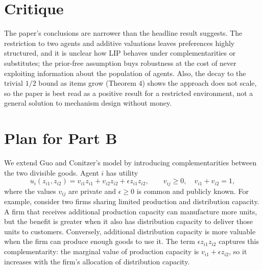\documentclass{article}
\begin{document}


\section{Critique}
The paper’s conclusions are narrower than the headline result suggests. The restriction to two agents and
additive valuations leaves preferences highly structured, and it is unclear how LIP behaves under complementarities or substitutes; the prior-free assumption buys robustness at the cost of never exploiting information
about the population of agents.
Also, the decay to the trivial $1/2$ bound as items grow (Theorem $4$) shows the approach does not scale, so
the paper is best read as a positive result for a restricted environment, not a general solution to mechanism
design without money.

\section{Plan for Part B}
We extend Guo and Conitzer's model by introducing complementarities between the two divisible goods. Agent $i$ has utility
\[
u_i(z_{i1},z_{i2})
=v_{i1}z_{i1}+v_{i2}z_{i2}+\epsilon z_{i1}z_{i2},
\qquad v_{ij}\geq0,\quad v_{i1}+v_{i2}=1,
\]
where the values $v_{ij}$ are private and $\epsilon\geq0$ is common and publicly known. For example, consider two firms sharing limited production and distribution capacity. A firm that receives additional production capacity can manufacture more units, but the benefit is greater when it also has distribution capacity to deliver those units to customers. Conversely, additional distribution capacity is more valuable when the firm can produce enough goods to use it. The term $\epsilon z_{i1}z_{i2}$ captures this complementarity: the marginal value of production capacity is $v_{i1}+\epsilon z_{i2}$, so it increases with the firm's allocation of distribution capacity.
\end{document}
